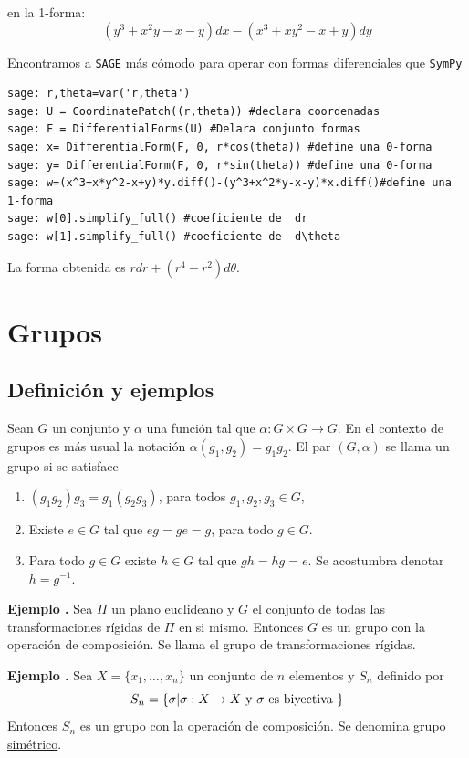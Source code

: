 \documentclass{article}
\renewcommand{\emph}[1]{\textcolor[rgb]{1,0,0}{#1}}
\newcounter{ejemplo_cont}
\newenvironment{ejemplo}{\noindent\textbf{Ejemplo  \arabic{ejemplo_cont}.} }{\addtocounter{ejemplo_cont}{1}}
\begin{document}
 en la 1-forma:
\[(y^3+x^2y-x-y)dx-(x^3+xy^2-x+y)dy\]



 Encontramos a  \texttt{SAGE} más cómodo para operar con formas diferenciales que \texttt{SymPy}
\begin{lstlisting}
sage: r,theta=var('r,theta')
sage: U = CoordinatePatch((r,theta)) #declara coordenadas
sage: F = DifferentialForms(U) #Delara conjunto formas
sage: x= DifferentialForm(F, 0, r*cos(theta)) #define una 0-forma
sage: y= DifferentialForm(F, 0, r*sin(theta)) #define una 0-forma
sage: w=(x^3+x*y^2-x+y)*y.diff()-(y^3+x^2*y-x-y)*x.diff()#define una 1-forma
sage: w[0].simplify_full() #coeficiente de  dr
sage: w[1].simplify_full() #coeficiente de  d\theta
\end{lstlisting}
La forma obtenida es $rdr+(r^4-r^2)d\theta$.


\section{Grupos}


\subsection{Definición y ejemplos}
\begin{definicion}[Grupo]
Sean $G$ un conjunto y $\alpha$ una función tal que   $\alpha:G\times G\to G$. En el contexto de grupos es más usual la notación  $\alpha(g_1,g_2)=g_1g_2$. El par $(G,\alpha)$ se llama un grupo si se satisface
\begin{enumerate}
\item $(g_1g_2)g_3=g_1(g_2g_3)$, para todos $g_1,g_2,g_3\in G$,
\item Existe $e\in G$ tal que $eg=ge=g$,  para todo $g\in G$.
\item Para todo $g\in G$ existe $h\in G$ tal que $gh=hg=e$. Se acostumbra denotar $h=g^{-1}$.
\end{enumerate}
\end{definicion}




\begin{ejemplo} Sea $\Pi$ un plano euclideano y $G$ el conjunto de todas las transformaciones rígidas de $\Pi$ en si mismo. Entonces $G$ es un grupo con la operación de composición. Se llama el \emph{grupo de transformaciones rígidas}.
 \end{ejemplo}


\begin{ejemplo}  Sea $X=\{x_1,\ldots,x_n\}$ un conjunto de $n$ elementos y $S_n$ definido por
\[S_n=\{\sigma|\sigma:X\to X\hbox{ y }\sigma \hbox{ es biyectiva }\}\]
Entonces $S_n$ es un grupo  con la operación de composición. Se denomina \href{http://es.wikipedia.org/wiki/Grupo_simétrico}{\emph{grupo simétrico}}.
 \end{ejemplo}
\end{document}
